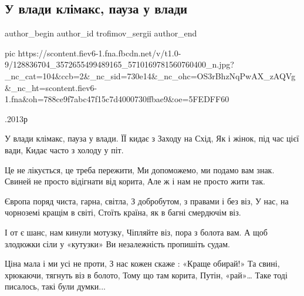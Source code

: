  
 
 
 
 
 
\subsection{У влади клімакс, пауза у влади}
\label{sec:01_12_2020.fb.trofimov_sergii.1.u_vlady_klimaks}
\ifcmt
	author_begin
   author_id trofimov_sergii
	author_end
\fi

\ifcmt
pic https://scontent.fiev6-1.fna.fbcdn.net/v/t1.0-9/128836704_3572655499489165_5710169781560760400_n.jpg?_nc_cat=104&ccb=2&_nc_sid=730e14&_nc_ohc=OS3rBhzNqPwAX_zAQVg&_nc_ht=scontent.fiev6-1.fna&oh=788ce9f7abc47f15c7d4000730ffbae9&oe=5FEDFF60
\fi

\begin{multicols}{2}
	.2013р

У влади клімакс, пауза у влади.
ЇЇ кидає з Заходу на Схід,
Як і жінок, під час цієї вади,
Кидає часто з холоду у піт.

Це не лікується, це треба пережити,
Ми допоможемо, ми подамо вам знак.
Свиней не просто відігнати від корита,
Але ж і нам не просто жити так.

Європа поряд чиста, гарна, світла,
З добробутом, з правами і без віз,
У нас, на чорноземі кращім в світі,
Стоїть країна, як в багні смердючім віз.

І от є шанс, нам кинули мотузку,
Чіпляйте віз, пора з болота вам.
А щоб злодюжки сіли у «кутузки»
Ви незалежність пропишіть судам.

Ціна мала і ми усі не проти,
З нас кожен скаже : «Краще обирай!»
Та свині, хрюкаючи, тягнуть віз в болото,
Тому що там корита, Путін, «рай»…
Таке тоді писалось, такі були думки...
	\restorecr
\end{multicols}
